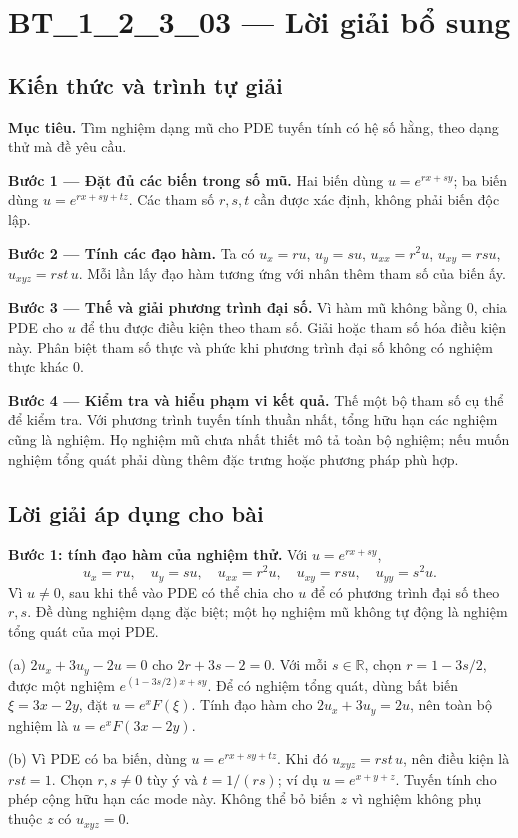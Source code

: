 \documentclass[10pt,a4paper]{article}
\begin{document}
\section*{BT\_1\_2\_3\_03 — Lời giải bổ sung}
\subsection*{Kiến thức và trình tự giải}
\textbf{Mục tiêu.} Tìm nghiệm dạng mũ cho PDE tuyến tính có hệ số hằng, theo dạng thử mà đề yêu cầu.

\textbf{Bước 1 — Đặt đủ các biến trong số mũ.} Hai biến dùng $u=e^{rx+sy}$; ba biến dùng $u=e^{rx+sy+tz}$. Các tham số $r,s,t$ cần được xác định, không phải biến độc lập.

\textbf{Bước 2 — Tính các đạo hàm.} Ta có $u_x=ru$, $u_y=su$, $u_{xx}=r^2u$, $u_{xy}=rsu$, $u_{xyz}=rst\,u$. Mỗi lần lấy đạo hàm tương ứng với nhân thêm tham số của biến ấy.

\textbf{Bước 3 — Thế và giải phương trình đại số.} Vì hàm mũ không bằng 0, chia PDE cho $u$ để thu được điều kiện theo tham số. Giải hoặc tham số hóa điều kiện này. Phân biệt tham số thực và phức khi phương trình đại số không có nghiệm thực khác 0.

\textbf{Bước 4 — Kiểm tra và hiểu phạm vi kết quả.} Thế một bộ tham số cụ thể để kiểm tra. Với phương trình tuyến tính thuần nhất, tổng hữu hạn các nghiệm cũng là nghiệm. Họ nghiệm mũ chưa nhất thiết mô tả toàn bộ nghiệm; nếu muốn nghiệm tổng quát phải dùng thêm đặc trưng hoặc phương pháp phù hợp.
\subsection*{Lời giải áp dụng cho bài}
\textbf{Bước 1: tính đạo hàm của nghiệm thử.} Với $u=e^{rx+sy}$,
\[u_x=ru,\quad u_y=su,\quad u_{xx}=r^2u,\quad u_{xy}=rsu,\quad u_{yy}=s^2u.\]
Vì $u\ne0$, sau khi thế vào PDE có thể chia cho $u$ để có phương trình đại số theo $r,s$. Đề dùng nghiệm dạng đặc biệt; một họ nghiệm mũ không tự động là nghiệm tổng quát của mọi PDE.

(a) $2u_x+3u_y-2u=0$ cho $2r+3s-2=0$. Với mỗi $s\in\mathbb R$, chọn $r=1-3s/2$, được một nghiệm $e^{(1-3s/2)x+sy}$. Để có nghiệm tổng quát, dùng bất biến $\xi=3x-2y$, đặt $u=e^xF(\xi)$. Tính đạo hàm cho $2u_x+3u_y=2u$, nên toàn bộ nghiệm là $u=e^xF(3x-2y)$.

(b) Vì PDE có ba biến, dùng $u=e^{rx+sy+tz}$. Khi đó $u_{xyz}=rst\,u$, nên điều kiện là $rst=1$. Chọn $r,s\ne0$ tùy ý và $t=1/(rs)$; ví dụ $u=e^{x+y+z}$. Tuyến tính cho phép cộng hữu hạn các mode này. Không thể bỏ biến $z$ vì nghiệm không phụ thuộc $z$ có $u_{xyz}=0$.
\end{document}
